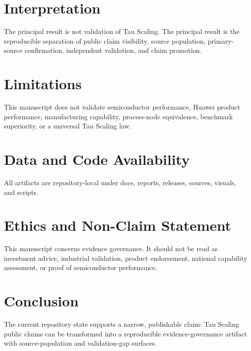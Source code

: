 \documentclass[11pt]{article}
\begin{document}
\section{Interpretation}
The principal result is not validation of Tau Scaling. The principal result is the reproducible separation of public claim visibility, source population, primary-source confirmation, independent validation, and claim promotion.

\section{Limitations}
This manuscript does not validate semiconductor performance, Huawei product performance, manufacturing capability, process-node equivalence, benchmark superiority, or a universal Tau Scaling law.

\section{Data and Code Availability}
All artifacts are repository-local under docs, reports, releases, sources, visuals, and scripts.

\section{Ethics and Non-Claim Statement}
This manuscript concerns evidence governance. It should not be read as investment advice, industrial validation, product endorsement, national capability assessment, or proof of semiconductor performance.

\section{Conclusion}
The current repository state supports a narrow, publishable claim: Tau Scaling public claims can be transformed into a reproducible evidence-governance artifact with source-population and validation-gap surfaces.
\end{document}
